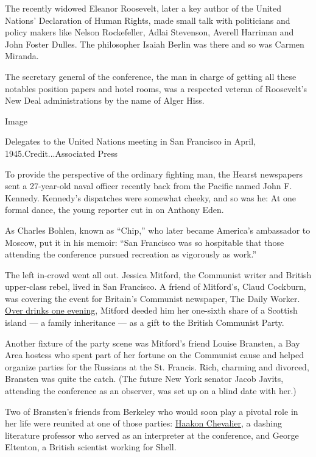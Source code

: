 The recently widowed Eleanor Roosevelt, later a key author of the United
Nations' Declaration of Human Rights, made small talk with politicians
and policy makers like Nelson Rockefeller, Adlai Stevenson, Averell
Harriman and John Foster Dulles. The philosopher Isaiah Berlin was there
and so was Carmen Miranda.

The secretary general of the conference, the man in charge of getting
all these notables position papers and hotel rooms, was a respected
veteran of Roosevelt's New Deal administrations by the name of Alger
Hiss.

Image

Delegates to the United Nations meeting in San Francisco in April,
1945.Credit...Associated Press

To provide the perspective of the ordinary fighting man, the Hearst
newspapers sent a 27-year-old naval officer recently back from the
Pacific named John F. Kennedy. Kennedy's dispatches were somewhat
cheeky, and so was he: At one formal dance, the young reporter cut in on
Anthony Eden.

As Charles Bohlen, known as ``Chip,'' who later became America's
ambassador to Moscow, put it in his memoir: ``San Francisco was so
hospitable that those attending the conference pursued recreation as
vigorously as work.''

The left in-crowd went all out. Jessica Mitford, the Communist writer
and British upper-class rebel, lived in San Francisco. A friend of
Mitford's, Claud Cockburn, was covering the event for Britain's
Communist newspaper, The Daily Worker.
\href{http://www.nytimes.com/1977/04/17/archives/memoirs-of-a-notsodutiful-daughter-they-were-an-unlikely-couple-in.html?mcubz=0\&_r=0}{Over
drinks one evening}, Mitford deeded him her one-sixth share of a
Scottish island --- a family inheritance --- as a gift to the British
Communist Party.

Another fixture of the party scene was Mitford's friend Louise Bransten,
a Bay Area hostess who spent part of her fortune on the Communist cause
and helped organize parties for the Russians at the St. Francis. Rich,
charming and divorced, Bransten was quite the catch. (The future New
York senator Jacob Javits, attending the conference as an observer, was
set up on a blind date with her.)

Two of Bransten's friends from Berkeley who would soon play a pivotal
role in her life were reunited at one of those parties:
\href{http://www.nytimes.com/1985/07/11/us/haakon-chevalier-83-author-and-translator.html?mcubz=0}{Haakon
Chevalier}, a dashing literature professor who served as an interpreter
at the conference, and George Eltenton, a British scientist working for
Shell.

